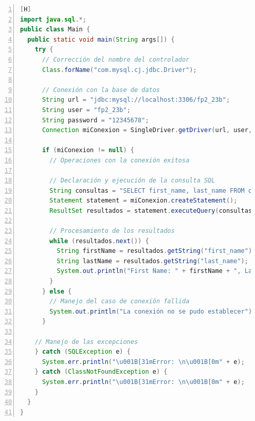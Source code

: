 \documentclass{article}
\begin{document}
      \begin{lstlisting}[language=Java, caption={Main.java}, numbers=left, firstnumber=1][H]
import java.sql.*;
public class Main {
  public static void main(String args[]) {
    try {
      // Corrección del nombre del controlador 
      Class.forName("com.mysql.cj.jdbc.Driver");

      // Conexión con la base de datos
      String url = "jdbc:mysql://localhost:3306/fp2_23b";
      String user = "fp2_23b";
      String password = "12345678";
      Connection miConexion = SingleDriver.getDriver(url, user, password);

      if (miConexion != null) {
        // Operaciones con la conexión exitosa

        // Declaración y ejecución de la consulta SQL
        String consultas = "SELECT first_name, last_name FROM owners";
        Statement statement = miConexion.createStatement();
        ResultSet resultados = statement.executeQuery(consultas);
        
        // Procesamiento de los resultados
        while (resultados.next()) {
          String firstName = resultados.getString("first_name");
          String lastName = resultados.getString("last_name");
          System.out.println("First Name: " + firstName + ", Last Name: " + lastName);
        }
      } else {
        // Manejo del caso de conexión fallida
        System.out.println("La conexión no se pudo establecer");
      }

    // Manejo de las excepciones
    } catch (SQLException e) {
      System.err.println("\u001B[31mError: \n\u001B[0m" + e);
    } catch (ClassNotFoundException e) {
      System.err.println("\u001B[31mError: \n\u001B[0m" + e);
    }
  }
}
    	\end{lstlisting}
\end{document}

